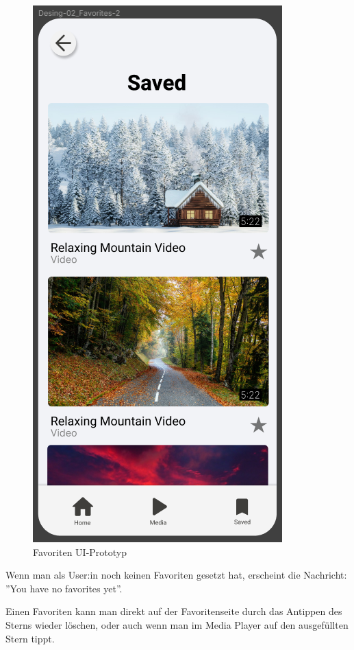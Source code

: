 \begin{figure}[H]
    \centering
    \includegraphics[height=\textwidth]{./pics/pFavoriten.png}
    \caption{Favoriten UI-Prototyp}
\end{figure}

\newpage

Wenn man als User:in noch keinen Favoriten gesetzt hat, erscheint die Nachricht: ''You have no favorites yet''.

Einen Favoriten kann man direkt auf der Favoritenseite durch das Antippen des Sterns wieder löschen, oder auch wenn
man im Media Player auf den ausgefüllten Stern tippt. 

